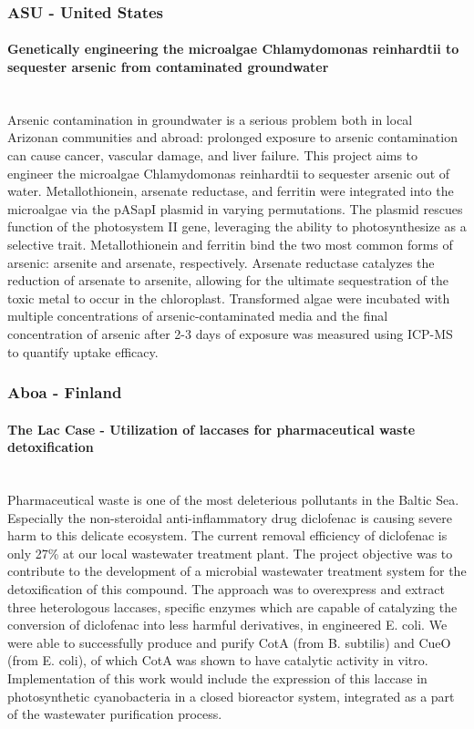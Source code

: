 \subsubsection*{ASU - United States}
\paragraph{Genetically engineering the microalgae Chlamydomonas reinhardtii to sequester arsenic from contaminated groundwater}\mbox{} \\
Arsenic contamination in groundwater is a serious problem both in local Arizonan communities and abroad: prolonged exposure to arsenic contamination can cause cancer, vascular damage, and liver failure. This project aims to engineer the microalgae Chlamydomonas reinhardtii to sequester arsenic out of water. Metallothionein, arsenate reductase, and ferritin were integrated into the microalgae via the pASapI plasmid in varying permutations. The plasmid rescues function of the photosystem II gene, leveraging the ability to photosynthesize as a selective trait. Metallothionein and ferritin bind the two most common forms of arsenic: arsenite and arsenate, respectively. Arsenate reductase catalyzes the reduction of arsenate to arsenite, allowing for the ultimate sequestration of the toxic metal to occur in the chloroplast. Transformed algae were incubated with multiple concentrations of arsenic-contaminated media and the final concentration of arsenic after 2-3 days of exposure was measured using ICP-MS to quantify uptake efficacy.

\subsubsection*{Aboa - Finland}
\paragraph{The Lac Case - Utilization of laccases for pharmaceutical waste detoxification}\mbox{} \\
Pharmaceutical waste is one of the most deleterious pollutants in the Baltic Sea. Especially the non-steroidal anti-inflammatory drug diclofenac is causing severe harm to this delicate ecosystem. The current removal efficiency of diclofenac is only 27\% at our local wastewater treatment plant. The project objective was to contribute to the development of a microbial wastewater treatment system for the detoxification of this compound. The approach was to overexpress and extract three heterologous laccases, specific enzymes which are capable of catalyzing the conversion of diclofenac into less harmful derivatives, in engineered E. coli. We were able to successfully produce and purify CotA (from B. subtilis) and CueO (from E. coli), of which CotA was shown to have catalytic activity in vitro. Implementation of this work would include the expression of this laccase in photosynthetic cyanobacteria in a closed bioreactor system, integrated as a part of the wastewater purification process.
\pagebreak
